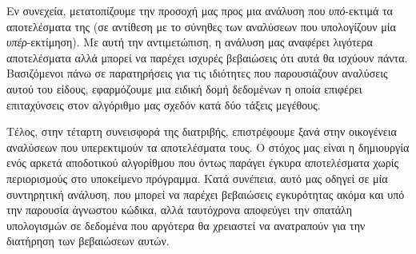 Εν συνεχεία, μετατοπίζουμε την προσοχή μας προς μια ανάλυση που \emph{υπό}-εκτιμά τα αποτελέσματα της (σε αντίθεση με το σύνηθες των αναλύσεων που υπολογίζουν μία \emph{υπέρ}-εκτίμηση). Με αυτή την αντιμετώπιση, η ανάλυση μας αναφέρει λιγότερα αποτελέσματα αλλά μπορεί να παρέχει ισχυρές βεβαιώσεις ότι αυτά θα ισχύουν πάντα. Βασιζόμενοι πάνω σε παρατηρήσεις για τις ιδιότητες που παρουσιάζουν αναλύσεις αυτού του είδους, εφαρμόζουμε μια ειδική δομή δεδομένων η οποία επιφέρει επιταχύνσεις στον αλγόριθμο μας σχεδόν κατά δύο τάξεις μεγέθους.

Τέλος, στην τέταρτη συνεισφορά της διατριβής, επιστρέφουμε ξανά στην οικογένεια αναλύσεων που υπερεκτιμούν τα αποτελέσματα τους. Ο στόχος μας είναι η δημιουργία ενός αρκετά αποδοτικού αλγορίθμου που όντως παράγει έγκυρα αποτελέσματα χωρίς περιορισμούς στο υποκείμενο πρόγραμμα. Κατά συνέπεια, αυτό μας οδηγεί σε μία συντηρητική ανάλυση, που μπορεί να παρέχει βεβαιώσεις εγκυρότητας ακόμα και υπό την παρουσία άγνωστου κώδικα, αλλά ταυτόχρονα αποφεύγει την σπατάλη υπολογισμών σε δεδομένα που αργότερα θα χρειαστεί να ανατραπούν για την διατήρηση των βεβαιώσεων αυτών.